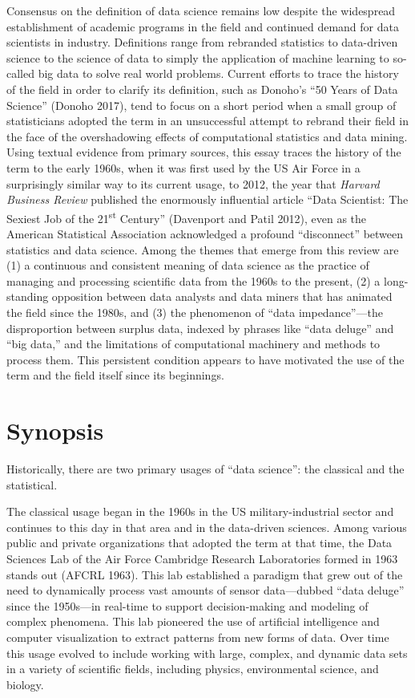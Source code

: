 \documentclass[
  letterpaper,
]{report}
\begin{document}
Consensus on the definition of data science remains low despite the
widespread establishment of academic programs in the field and continued
demand for data scientists in industry. Definitions range from rebranded
statistics to data-driven science to the science of data to simply the
application of machine learning to so-called big data to solve real
world problems. Current efforts to trace the history of the field in
order to clarify its definition, such as Donoho's ``50 Years of Data
Science'' (Donoho 2017), tend to focus on a short period when a small
group of statisticians adopted the term in an unsuccessful attempt to
rebrand their field in the face of the overshadowing effects of
computational statistics and data mining. Using textual evidence from
primary sources, this essay traces the history of the term to the early
1960s, when it was first used by the US Air Force in a surprisingly
similar way to its current usage, to 2012, the year that \emph{Harvard
Business Review} published the enormously influential article ``Data
Scientist: The Sexiest Job of the 21\textsuperscript{st} Century''
(Davenport and Patil 2012), even as the American Statistical Association
acknowledged a profound ``disconnect'' between statistics and data
science. Among the themes that emerge from this review are (1) a
continuous and consistent meaning of data science as the practice of
managing and processing scientific data from the 1960s to the present,
(2) a long-standing opposition between data analysts and data miners
that has animated the field since the 1980s, and (3) the phenomenon of
``data impedance''---the disproportion between surplus data, indexed by
phrases like ``data deluge'' and ``big data,'' and the limitations of
computational machinery and methods to process them. This persistent
condition appears to have motivated the use of the term and the field
itself since its beginnings.

\hypertarget{synopsis}{%
\chapter{Synopsis}\label{synopsis}}

Historically, there are two primary usages of ``data science'': the
classical and the statistical.

The classical usage began in the 1960s in the US military-industrial
sector and continues to this day in that area and in the data-driven
sciences. Among various public and private organizations that adopted
the term at that time, the Data Sciences Lab of the Air Force Cambridge
Research Laboratories formed in 1963 stands out (AFCRL 1963). This lab
established a paradigm that grew out of the need to dynamically process
vast amounts of sensor data---dubbed ``data deluge'' since the
1950s---in real-time to support decision-making and modeling of complex
phenomena. This lab pioneered the use of artificial intelligence and
computer visualization to extract patterns from new forms of data. Over
time this usage evolved to include working with large, complex, and
dynamic data sets in a variety of scientific fields, including physics,
environmental science, and biology.
\end{document}

